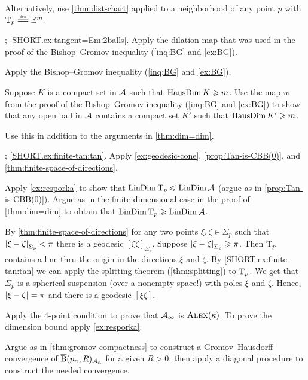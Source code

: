 Alternatively, use \ref{thm:dist-chart} applied to a neighborhood of any point $p$ with $\T_p\iso \EE^m$.

\parbf{\ref{ex:tangent=Em}}; \ref{SHORT.ex:tangent=Em:2balls}.
Apply the dilation map that was used in the proof of the Bishop–Gromov inequality (\ref{inq:BG} and \ref{ex:BG}).

Apply the Bishop--Gromov inequality (\ref{inq:BG} and \ref{ex:BG}).

Suppose $K$ is a compact set in $\mathcal{A}$ such that $\mathop{\rm HausDim}\nolimits K\geqslant m$.
Use the map $w$ from the proof of the Bishop--Gromov inequality (\ref{inq:BG} and \ref{ex:BG}) to show that any open ball in $\mathcal{A}$ contains a compact set $K'$ such that $\mathop{\rm HausDim}\nolimits K'\geqslant m$.

Use this in addition to the arguments in \ref{thm:dim=dim}. 

\parbf{\ref{ex:finite-tan}};
\ref{SHORT.ex:finite-tan:tan}. Apply \ref{ex:geodesic-cone}, \ref{prop:Tan-is-CBB(0)}, and \ref{thm:finite-space-of-directions}.

Apply \ref{ex:resporka} to show that $\mathop{\rm LinDim}\nolimits\mathrm{T}_p\leqslant\mathop{\rm LinDim}\nolimits\mathcal{A}$ (argue as in \ref{prop:Tan-is-CBB(0)}).
Argue as in the finite-dimensional case in the proof of \ref{thm:dim=dim} to obtain that $\mathop{\rm LinDim}\nolimits\mathrm{T}_p\geqslant\mathop{\rm LinDim}\nolimits\mathcal{A}$.

By \ref{thm:finite-space-of-directions} for any two points $\xi,\zeta\in\Sigma_p$ such that $\dist{\xi}{\zeta}{\Sigma_p}<\pi$ there is a geodesic $[\xi\zeta]_{\Sigma_p}$.
Suppose $\dist{\xi}{\zeta}{\Sigma_p}\ge\pi$.
Then $\mathrm{T}_p$ contains a line thru the origin in the directions $\xi$ and $\zeta$.
By \ref{SHORT.ex:finite-tan:tan} we can apply the splitting theorem (\ref{thm:splitting}) to $\mathrm{T}_p$.
We get that $\Sigma_p$ is a spherical suspension (over a nonempty space!) with poles $\xi$ and $\zeta$.
Hence, $\dist\xi\zeta{}=\pi$ and there is a geodesic $[\xi\zeta]$.

Apply the 4-point condition to prove that $\mathcal{A}_\infty$ is $\textup{\textsc{Alex}}(\kappa)$.
To prove the dimension bound apply \ref{ex:resporka}.

Argue as in \ref{thm:gromov-compactness} to construct a Gromov--Hausdorff convergence of $\overline{\mathrm{B}}{}(p_n,R)_{\mathcal{A}_n}$ for a given $R>0$, then apply a diagonal procedure to construct the needed convergence.

